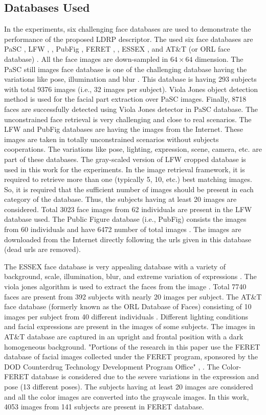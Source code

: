 \documentclass[a4paper]{article}
\begin{document}
\subsection{Databases Used}
In the experiments, six challenging face databases are used to demonstrate the performance of the proposed LDRP descriptor. The used six face databases are PaSC \cite{pasc}, LFW \cite{lfw}, \cite{lfw1}, PubFig \cite{pubfig}, FERET \cite{feret}, \cite{feret1}, ESSEX \cite{essex}, and AT\&T (or ORL face database) \cite{att}. All the face images are down-sampled in $64\times64$ dimension. The PaSC still images face database is one of the challenging database having the variations like pose, illumination and blur \cite{pasc}. This database is having 293 subjects with total 9376 images (i.e., 32 images per subject). Viola Jones object detection method \cite{viola} is used for the facial part extraction over PaSC images. Finally, 8718 faces are successfully detected using Viola Jones detector in PaSC database. The unconstrained face retrieval is very challenging and close to real scenarios. The LFW and PubFig databases are having the images from the Internet. These images are taken in totally unconstrained scenarios without subjects cooperations. The variations like pose, lighting, expression, scene, camera, etc. are part of these databases. The gray-scaled version of LFW cropped database \cite{lfw1} is used in this work for the experiments. In the image retrieval framework, it is required to retrieve more than one (typically 5, 10, etc.) best matching images. So, it is required that the sufficient number of images should be present in each category of the database. Thus, the subjects having at least 20 images are considered. Total 3023 face images from 62 individuals are present in the LFW database used. The Public Figure database (i.e., PubFig) consists the images from 60 individuals and have 6472 number of total images \cite{pubfig}. The images are downloaded from the Internet directly following the urls given in this database (dead urls are removed). 

The ESSEX face database is very appealing database with a variety of background, scale, illumination, blur, and extreme variation of expressions \cite{essex}. The viola jones algorithm is used to extract the faces from the image \cite{viola}. Total 7740 faces are present from 392 subjects with nearly 20 images per subject.
The AT\&T face database (formerly known as the ORL Database of Faces) consisting of 10 images per subject from 40 different individuals \cite{att}. Different lighting conditions and facial expressions are present in the images of some subjects. The images in AT\&T database are captured in an upright and frontal position with a dark homogeneous background.
"Portions of the research in this paper use the FERET database of facial images collected under the FERET program, sponsored by the DOD Counterdrug Technology Development Program Office" \cite{feret}, \cite{feret1}. The Color-FERET database is considered due to the severe variations in the expression and pose (13 different poses). The subjects having at least 20 images are considered and all the color images are converted into the grayscale images. In this work, 4053 images from 141 subjects are present in FERET database. 
\end{document}
